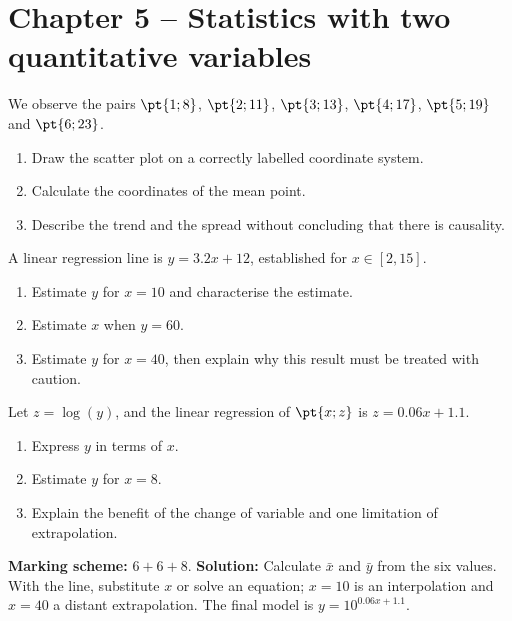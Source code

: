 \section*{Chapter 5 -- Statistics with two quantitative variables}
\begin{exercise}
We observe the pairs $\pt{1;8}$, $\pt{2;11}$, $\pt{3;13}$, $\pt{4;17}$, $\pt{5;19}$ and $\pt{6;23}$.
\begin{enumerate}
\item Draw the scatter plot on a correctly labelled coordinate system.
\item Calculate the coordinates of the mean point.
\item Describe the trend and the spread without concluding that there is causality.
\end{enumerate}
\end{exercise}
\begin{exercise}
A linear regression line is $y=\num{3,2}x+12$, established for $x\in[2,15]$.
\begin{enumerate}
\item Estimate $y$ for $x=10$ and characterise the estimate.
\item Estimate $x$ when $y=60$.
\item Estimate $y$ for $x=40$, then explain why this result must be treated with caution.
\end{enumerate}
\end{exercise}
\begin{exercise}
Let $z=\log(y)$, and the linear regression of $\pt{x;z}$ is $z=\num{0,06}x+\num{1,1}$.
\begin{enumerate}
\item Express $y$ in terms of $x$.
\item Estimate $y$ for $x=8$.
\item Explain the benefit of the change of variable and one limitation of extrapolation.
\end{enumerate}
\end{exercise}
\begin{solution}\textbf{Marking scheme:} $6+6+8$. \textbf{Solution:} Calculate $\bar x$ and $\bar y$ from the six values. With the line, substitute $x$ or solve an equation; $x=10$ is an interpolation and $x=40$ a distant extrapolation. The final model is $y=10^{\num{0,06}x+\num{1,1}}$.\end{solution}

